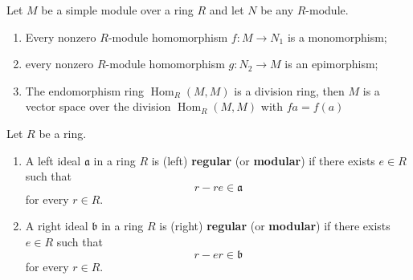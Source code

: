 \begin{lemma}[Schur]
    \label{lem: Schur's lemma}
    Let $M$ be a simple module over a ring $R$ and let $N$ be any $R$-module.

    \begin{enumerate}
        \item Every nonzero $R$-module homomorphism $f: M \rightarrow N_1$ is a monomorphism;

        \item every nonzero $R$-module homomorphism $g: N_2 \rightarrow M$ is an epimorphism;

        \item The endomorphism ring $\operatorname{Hom}_{R}(M,M)$ is a division ring,
              then $M$ is a vector space over the division $\operatorname{Hom}_R(M,M)$ with $f a=f(a)$
    \end{enumerate}
\end{lemma}

\begin{definition}
    Let $R$ be a ring.

    \begin{enumerate}
        \item
              A left ideal $\mathfrak{a}$ in a ring $R$ is (left) \textbf{regular} (or \textbf{modular}) if there exists $e \in R$ such that
              \begin{equation*}
                  r-re \in \mathfrak{a}
              \end{equation*}
              for every $r \in R$.
        \item
              A right ideal $\mathfrak{b}$ in a ring $R$ is (right) \textbf{regular} (or \textbf{modular}) if there exists $e \in R$ such that
              \begin{equation*}
                  r-er \in \mathfrak{b}
              \end{equation*}
              for every $r \in R$.
    \end{enumerate}
\end{definition}


